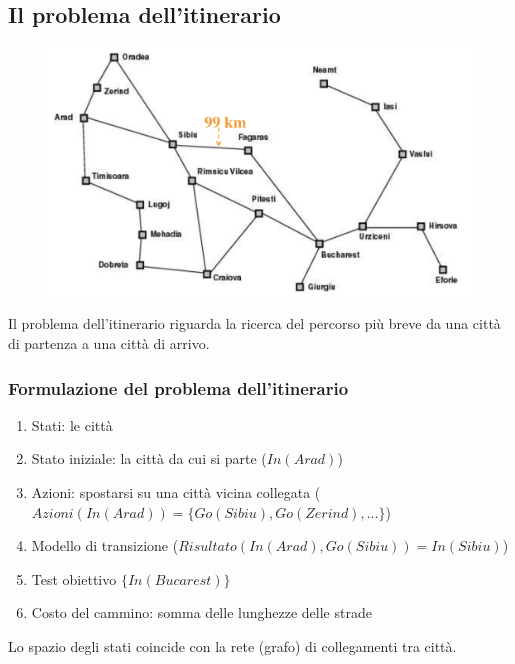 \documentclass{article}
\begin{document}
\subsection{Il problema dell'itinerario}
\begin{figure}[H]
    \centering
    \includegraphics[scale=0.35]{Images/itinerarioproblema.png}
\end{figure}
Il problema dell'itinerario riguarda la ricerca del percorso più breve da una città di partenza a una città di arrivo.

\subsubsection{Formulazione del problema dell'itinerario}
\begin{enumerate}
    \item Stati: le città
    \item Stato iniziale: la città da cui si parte ($In(Arad)$)
    \item Azioni: spostarsi su una città vicina collegata ($Azioni(In(Arad)) = \{Go(Sibiu), Go(Zerind), ...\}$)
    \item Modello di transizione ($Risultato(In(Arad), Go(Sibiu)) = In(Sibiu)$)
    \item Test obiettivo $\{In(Bucarest)\}$
    \item Costo del cammino: somma delle lunghezze delle strade
\end{enumerate}
Lo spazio degli stati coincide con la rete (grafo) di collegamenti tra città.
\end{document}
